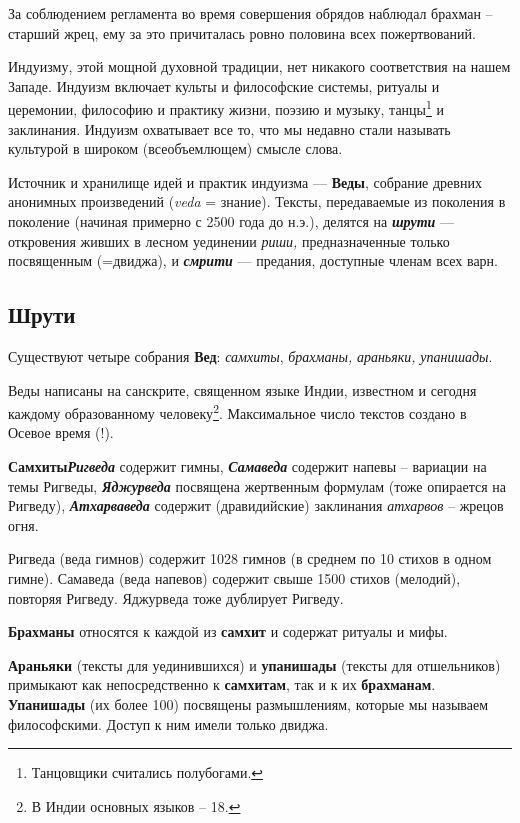 За соблюдением регламента во время совершения обрядов наблюдал брахман – старший жрец, ему за это причиталась ровно
половина всех пожертвований.

Индуизму, этой мощной духовной традиции, нет никакого соответствия на нашем Западе. Индуизм включает культы и
философские системы, ритуалы и церемонии, философию и практику жизни, поэзию и музыку,
танцы\footnote{Танцовщики считались полубогами.} и заклинания. Индуизм охватывает все то,
что мы недавно стали называть культурой в широком (всеобъемлющем) смысле слова.

Источник и хранилище идей и практик индуизма — \textbf{Веды}, собрание древних анонимных произведений
(\textit{veda} = знание). Тексты, передаваемые из поколения в поколение (начиная примерно с
2500 года до н.э.), делятся на \textbf{\textit{шрути}} — откровения живших в лесном уединении \textit{риши,}
предназначенные только посвященным (=двиджа), и \textbf{\textit{смрити}} — предания, доступные членам всех варн.

\subsection{Шрути }
Существуют четыре собрания \textbf{Вед}: \textit{самхиты}, \textit{брахманы,} \textit{араньяки,}
\textit{упанишады}.


Веды написаны на санскрите, священном языке Индии, известном и сегодня каждому \textup{образованному}
человеку\footnote{В Индии основных языков – 18.}. Максимальное число текстов создано в
Осевое время (!).

\textbf{Самхиты}\textbf{\textit{Ригведа}} содержит гимны, \textbf{\textit{Самаведа}} содержит напевы –
вариации на темы Ригведы, \textbf{\textit{Яджурведа}} посвящена жертвенным формулам (тоже опирается на Ригведу),
\textbf{\textit{Атхарваведа}} содержит (дравидийские) заклинания \textit{атхарвов} – жрецов огня.


Ригведа (веда гимнов) содержит 1028 гимнов (в среднем по 10 стихов в одном гимне). Самаведа (веда напевов) содержит
свыше 1500 стихов (мелодий), повторяя Ригведу. Яджурведа тоже дублирует Ригведу.

\textbf{Брахманы} относятся к каждой из \textbf{самхит} и содержат ритуалы и мифы.

\textbf{Араньяки} (тексты для уединившихся) и \textbf{упанишады} (тексты для отшельников) примыкают как непосредственно
к \textbf{самхитам}, так и к их \textbf{брахманам}. \textbf{Упанишады} (их более 100) посвящены размышлениям, которые
мы называем философскими. Доступ к ним имели только двиджа.


